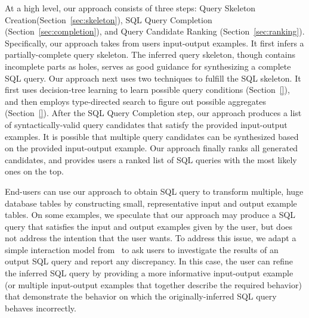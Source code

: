 At a high level, our approach consists of three steps: Query Skeleton
Creation(Section~\ref{sec:skeleton}), SQL Query Completion
(Section~\ref{sec:completion}), and Query Candidate Ranking (Section~\ref{sec:ranking}).
Specifically, our approach takes from users input-output examples. It first infers
a partially-complete query skeleton. The inferred query skeleton, though contains
incomplete parts as holes, serves as good guidance for synthesizing a complete SQL query.
Our approach next uses two techniques to fulfill the SQL skeleton. It first
uses decision-tree learning to learn possible query conditions (Section~\ref{}), and
then employs type-directed search to figure out possible aggregates (Section~\ref{}).
After the SQL Query Completion step, our approach produces a list of syntactically-valid
query candidates that satisfy the provided input-output examples.
It is possible that multiple query candidates can be synthesized based on the
provided input-output example. Our approach finally ranks all generated candidates,
and provides users a ranked list of SQL queries with the most likely ones on the top. 


End-users can use our approach to obtain SQL query to transform
multiple, huge database tables by constructing small, representative
input and output example tables. On some examples, we speculate
that our approach
may produce a SQL query that satisfies the input and output examples
given by the user, but does not address the intention
that the user wants. To address this issue, we adapt a simple
interaction model from~\cite{Harris:2011} to ask users to investigate the results of
an output SQL query and report any discrepancy. In this case,
the user can refine the inferred SQL query by providing a more
informative input-output example (or multiple input-output examples
that together describe the required behavior) that demonstrate the behavior on
which the originally-inferred SQL query behaves incorrectly.










